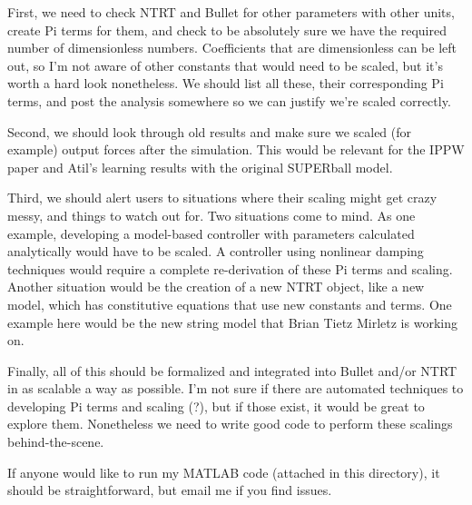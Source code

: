 \documentclass[12pt,letterpaper]{article}
\begin{document}
First, we need to check NTRT and Bullet for other parameters with other units, create Pi terms for them, and check to be absolutely sure we have the required number of dimensionless numbers.
Coefficients that are dimensionless can be left out, so I'm not aware of other constants that would need to be scaled, but it's worth a hard look nonetheless.
We should list all these, their corresponding Pi terms, and post the analysis somewhere so we can justify we're scaled correctly.

Second, we should look through old results and make sure we scaled (for example) output forces after the simulation.
This would be relevant for the IPPW paper and Atil's learning results with the original SUPERball model.

Third, we should alert users to situations where their scaling might get crazy messy, and things to watch out for.
Two situations come to mind.
As one example, developing a model-based controller with parameters calculated analytically would have to be scaled. A controller using nonlinear damping techniques would require a complete re-derivation of these Pi terms and scaling.
Another situation would be the creation of a new NTRT object, like a new model, which has constitutive equations that use new constants and terms.
One example here would be the new string model that Brian Tietz Mirletz is working on.

Finally, all of this should be formalized and integrated into Bullet and/or NTRT in as scalable a way as possible.
I'm not sure if there are automated techniques to developing Pi terms and scaling (?), but if those exist, it would be great to explore them.
Nonetheless we need to write good code to perform these scalings behind-the-scene.

If anyone would like to run my MATLAB code (attached in this directory), it should be straightforward, but email me if you find issues.



\end{document}
